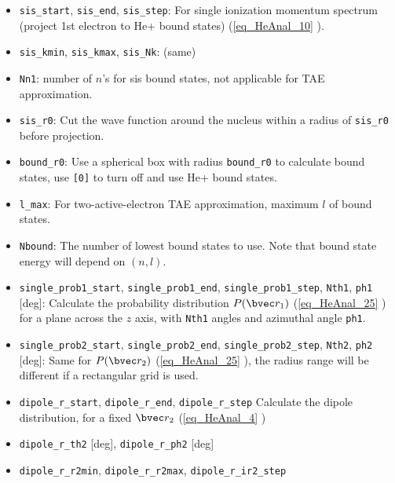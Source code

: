 \begin{itemize}
\item \verb`sis_start`, \verb`sis_end`, \verb`sis_step`: For single ionization momentum spectrum (project 1st electron to He+ bound states) (\autoref{eq_HeAnal_10} ).
\item \verb`sis_kmin`, \verb`sis_kmax`, \verb`sis_Nk`: (same)
\item \verb`Nn1`: number of $n$'s for sis bound states, not applicable for TAE approximation.
\item \verb`sis_r0`: Cut the wave function around the nucleus within a radius of \verb|sis_r0| before projection.
\item \verb`bound_r0`: Use a spherical box with radius \verb`bound_r0` to calculate bound states, use \verb|[0]| to turn off and use He+ bound states.
\item \verb`l_max`: For two-active-electron TAE approximation, maximum $l$ of bound states.
\item \verb`Nbound`: The number of lowest bound states to use. Note that bound state energy will depend on $(n, l)$.

\item \verb`single_prob1_start`, \verb`single_prob1_end`, \verb`single_prob1_step`, \verb`Nth1`, \verb`ph1` [deg]: Calculate the probability distribution $P(\bvec r_1)$ (\autoref{eq_HeAnal_25} ) for a plane across the $z$ axis, with \verb|Nth1| angles and azimuthal angle \verb|ph1|.

\item \verb`single_prob2_start`, \verb`single_prob2_end`, \verb`single_prob2_step`, \verb`Nth2`, \verb`ph2` [deg]: Same for $P(\bvec r_2)$ (\autoref{eq_HeAnal_25} ), the radius range will be different if a rectangular grid is used.
\item \verb`dipole_r_start`, \verb`dipole_r_end`, \verb`dipole_r_step` Calculate the dipole distribution, for a fixed $\bvec r_2$ (\autoref{eq_HeAnal_4} )
\item \verb`dipole_r_th2` [deg], \verb`dipole_r_ph2` [deg]
\item \verb`dipole_r_r2min`, \verb`dipole_r_r2max`, \verb`dipole_r_ir2_step`
\end{itemize}

